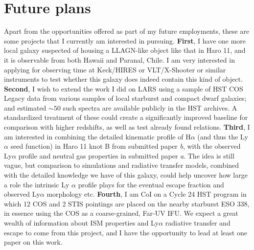 \documentclass[10pt, letterpaper, headings=Large, DIV=14]{scrartcl}
\begin{document}
\section*{Future plans}

Apart from the opportunities offered as part of my future employments, these are
some projects that I currently am interested in pursuing.  \textbf{First}, I
have one more local galaxy suspected of housing a LLAGN-like object like that in
Haro 11, and it is observable from both Hawaii and Paranal, Chile. I am very
interested in applying for observing time at Keck/HIRES or VLT/X-Shooter or
similar instruments to test whether this galaxy does indeed contain this kind of
object.  \textbf{Second}, I wish to extend the work I did on LARS using a sample
of HST COS Legacy data from various samples of local starburst and compact dwarf
galaxies; and estimated $\sim 50$ such spectra are available publicly in the HST
archives. A standardized treatment of these could create a significantly
improved baseline for comparison with higher redshifts, as well as test already
found relations. \textbf{Third}, I am interested in combining the detailed
kinematic profile of H$\alpha$ (and thus the Ly $\alpha$ seed function) in Haro
11 knot B from submitted paper \emph{b}, with the observed Ly$\alpha$ profile
and neutral gas properties in submitted paper \emph{a}. The idea is still vague,
but comparison to simulations and radiative transfer models, combined with the
detailed knowledge we have of this galaxy, could help uncover how large a role
the intrinsic Ly $\alpha$ profile plays for the eventual escape fraction and
observed Ly$\alpha$ morphology etc. \textbf{Fourth}, I am CoI on a Cycle 24 HST
program in which 12 COS and 2 STIS pointings are placed on the nearby starburst
ESO 338, in essence using the COS as a coarse-grained, Far-UV IFU\@. We expect a
great wealth of information about ISM properties and Ly$\alpha$ radiative
transfer and escape to come from this project, and I have the opportunity to
lead at least one paper on this work. 
 \begin{scriptsize} \begin{multicols}{2}
 \end{multicols} \end{scriptsize}
\end{document}
